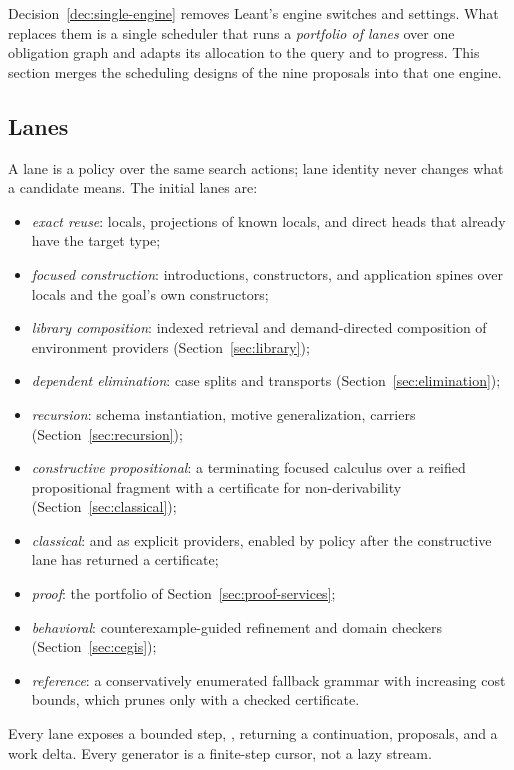 Decision~\ref{dec:single-engine} removes Leant's engine switches and settings. What replaces them is a single scheduler that runs a \emph{portfolio of lanes} over one obligation graph and adapts its allocation to the query and to progress. This section merges the scheduling designs of the nine proposals into that one engine.

\subsection{Lanes}

A lane is a policy over the same search actions; lane identity never changes what a candidate means. The initial lanes are:
\begin{itemize}
\item \emph{exact reuse}: locals, projections of known locals, and direct heads that already have the target type;
\item \emph{focused construction}: introductions, constructors, and application spines over locals and the goal's own constructors;
\item \emph{library composition}: indexed retrieval and demand-directed composition of environment providers (Section~\ref{sec:library});
\item \emph{dependent elimination}: case splits and transports (Section~\ref{sec:elimination});
\item \emph{recursion}: schema instantiation, motive generalization, carriers (Section~\ref{sec:recursion});
\item \emph{constructive propositional}: a terminating focused calculus over a reified propositional fragment with a certificate for non-derivability (Section~\ref{sec:classical});
\item \emph{classical}:  and  as explicit providers, enabled by policy after the constructive lane has returned a certificate;
\item \emph{proof}: the portfolio of Section~\ref{sec:proof-services};
\item \emph{behavioral}: counterexample-guided refinement and domain checkers (Section~\ref{sec:cegis});
\item \emph{reference}: a conservatively enumerated fallback grammar with increasing cost bounds, which prunes only with a checked certificate.
\end{itemize}
Every lane exposes a bounded step, , returning a continuation, proposals, and a work delta. Every generator is a finite-step cursor, not a lazy stream.

